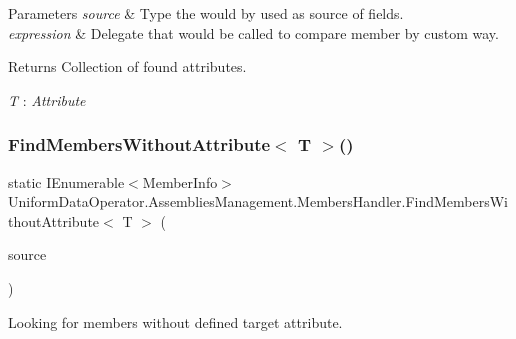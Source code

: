 \begin{DoxyParams}{Parameters}
{\em source} & Type the would by used as source of fields.\\
\hline
{\em expression} & Delegate that would be called to compare member by custom way.\\
\hline
\end{DoxyParams}
\begin{DoxyReturn}{Returns}
Collection of found attributes.
\end{DoxyReturn}
\begin{Desc}
\item[Type Constraints]\begin{description}
\item[{\em T} : {\em Attribute}]\end{description}
\end{Desc}
\mbox{\label{class_uniform_data_operator_1_1_assemblies_management_1_1_members_handler_a5c40c81b34d93d301c5f0d421dadc39a}} 
\subsubsection{\texorpdfstring{Find\+Members\+Without\+Attribute$<$ T $>$()}{FindMembersWithoutAttribute< T >()}\hspace{0.1cm}{\footnotesize\ttfamily [2/2]}}
{\footnotesize\ttfamily static I\+Enumerable$<$Member\+Info$>$ Uniform\+Data\+Operator.\+Assemblies\+Management.\+Members\+Handler.\+Find\+Members\+Without\+Attribute$<$ T $>$ (\begin{DoxyParamCaption}\item[{I\+Enumerable$<$ Member\+Info $>$}]{source }\end{DoxyParamCaption})\hspace{0.3cm}{\ttfamily [static]}}



Looking for members without defined target attribute. 


